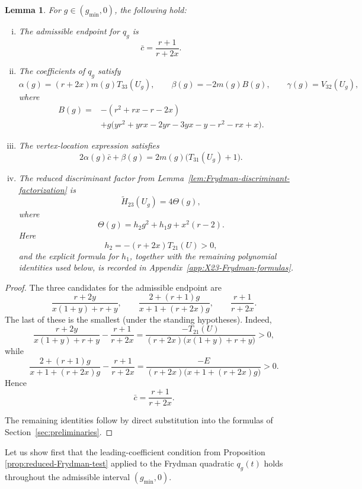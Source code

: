 \documentclass[11pt,onecolumn]{amsart}
\theoremstyle{plain}
\newtheorem{lemma}[theorem]{Lemma}
\theoremstyle{definition}
\theoremstyle{remark}
\begin{document}
\begin{lemma}
	\label{lem:X23-reduced-data}
	For $g\in(g_{\min},0)$, the following hold:
\begin{enumerate}[(i)]	
\item
The admissible endpoint for $q_g$ is
	\[
	\bar c=\frac{r+1}{r+2x}.
	\]

\item
The coefficients of $q_g$ satisfy 
	\[
	\alpha(g)=(r+2x)m(g)T_{33}(U_g),
	\qquad
	\beta(g)=-2m(g)B(g),
	\qquad
	\gamma(g)=V_{32}(U_g),
	\]
	where
	\[
	\begin{aligned}
		B(g)={}&-(r^2+rx-r-2x)\\
		&+g\bigl(yr^2+yrx-2yr-3yx-y-r^2-rx+x\bigr).
	\end{aligned}
	\]
	
\item	
	The vertex-location expression satisfies
	\[
	2\alpha(g)\bar c+\beta(g)
	=2m(g)\bigl(T_{31}(U_g)+1\bigr).
	\]
	
	
\item	
The reduced discriminant factor from
	Lemma~\ref{lem:Frydman-discriminant-factorization} is
	\[
	\widetilde H_{23}(U_g)=4\Theta(g),
	\]
	where
	\[
	\Theta(g)=h_2g^2+h_1g+x^2(r-2).
	\]
	Here
	\[
	h_2=-(r+2x)T_{21}(U)>0,
	\]
	and the explicit formula for $h_1$, together with the remaining
	polynomial identities used below, is recorded in
	Appendix~\ref{app:X23-Frydman-formulas}.
\end{enumerate}	
\end{lemma}

\begin{proof}
	The three candidates for the admissible endpoint are
	\[
	\frac{r+2y}{x(1+y)+r+y},
	\qquad
	\frac{2+(r+1)g}{x+1+(r+2x)g},
	\qquad
	\frac{r+1}{r+2x}.
	\]
	The last of these is the smallest (under the standing hypotheses). Indeed,
	\[
	\frac{r+2y}{x(1+y)+r+y}
	-\frac{r+1}{r+2x}
	=
	\frac{-T_{21}(U)}
	{(r+2x)\bigl(x(1+y)+r+y\bigr)}>0,
	\]
	while
	\[
	\frac{2+(r+1)g}{x+1+(r+2x)g}
	-\frac{r+1}{r+2x}
	=
	\frac{-E}
	{(r+2x)\bigl(x+1+(r+2x)g\bigr)}>0.
	\]
	Hence
	\[
	\bar c=\frac{r+1}{r+2x}.
	\]
	
	The remaining identities follow by direct substitution into the
	formulas of Section~\ref{sec:preliminaries}.
\end{proof}




Let us show first that the leading-coefficient condition from Proposition \ref{prop:reduced-Frydman-test}
applied to the Frydman quadratic $q_g(t)$ holds throughout the 
admissible interval $(g_{\min},0)$.
\end{document}
